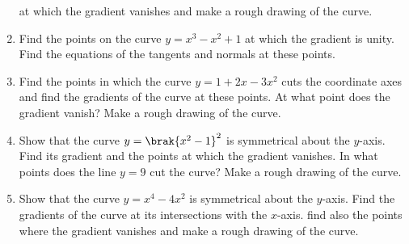\begin{enumerate}[1.]
at which the gradient vanishes and make a rough drawing of the curve.
\item Find the points on the curve $y=x^3-x^2+1$ at which the gradient is unity.  Find the equations of the tangents
and normals at these points.
\item Find the points in which the curve $y=1+2x-3x^2$ cuts the coordinate axes and find the gradients of the curve
at these points.  At what point does the gradient vanish?  Make a rough drawing of the
curve.
\item Show that the curve $y=\brak{x^2-1}^2$ is symmetrical about the $y$-axis.  Find its gradient and the points at which
the gradient vanishes.  In what points does the line $y=9$ cut the curve?  Make a rough drawing of the curve.
\item Show that the curve $y=x^4-4x^2$ is symmetrical about the $y$-axis.  Find the gradients of the curve
at its intersections with the $x$-axis.  find also the points where the gradient vanishes and make a
rough drawing of the curve.


\end{enumerate}

